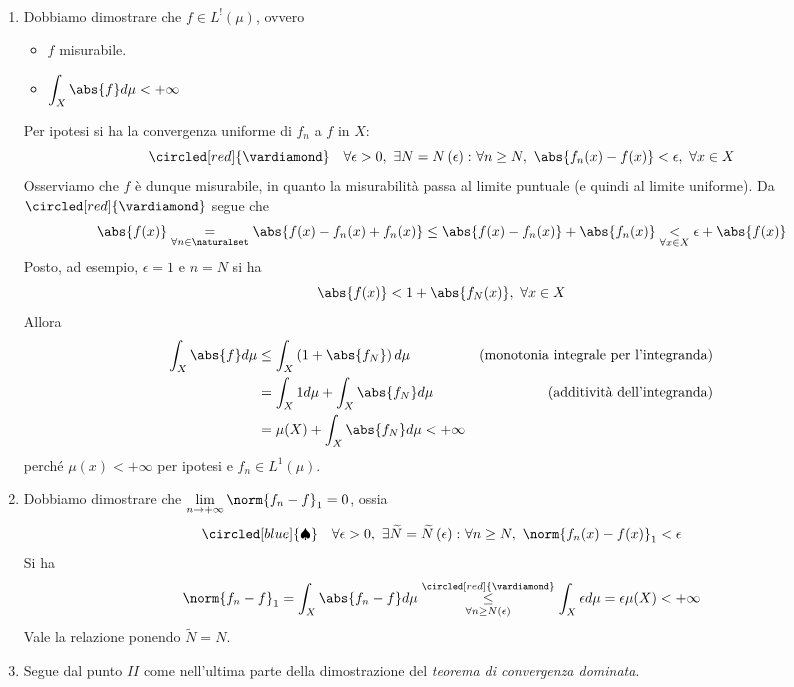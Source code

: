 \begin{demonstration}~{}
	\begin{enumerate}[label=(\Roman*)]
		\item Dobbiamo dimostrare che $f\in L^!\left(\mu\right)$, ovvero
		\begin{itemize}
			\item $f$ misurabile.
			\item $\displaystyle\int_X\abs{f}d\mu<+\infty$
		\end{itemize}
		Per ipotesi si ha la convergenza uniforme di $f_n$ a $f$ in $X$:
		\begin{equation*}
			\circled[red]{\vardiamond}\quad \forall \epsilon > 0,\ \exists N=N\left(\epsilon\right)\colon \forall n\geq N,\ \abs{f_n(x)-f(x)}<\epsilon,\ \forall x\in X
		\end{equation*}
		Osserviamo che $f$ è dunque misurabile, in quanto la misurabilità passa al limite puntuale (e quindi al limite uniforme). Da $\circled[red]{\vardiamond}$ segue che
		\begin{equation*}
			\abs{f(x)}\underset{\forall n\in\naturalset}{=}\abs{f(x)-f_n(x)+f_n(x)}\leq\abs{f(x)-f_n(x)}+\abs{f_n(x)}\underset{\forall x\in X}{<}\epsilon +\abs{f(x)}
		\end{equation*}
		Posto, ad esempio, $\epsilon = 1$ e $n=N$ si ha
		\begin{equation*}
			\abs{f(x)}<1+\abs{f_N(x)},\ \forall x\in X
		\end{equation*}
		Allora
		\begin{align*}
			\int_X\abs{f}d\mu&\leq \int_X \left(1+\abs{f_N}\right)d\mu&\text{(monotonia integrale per l'integranda)}\\
			&=\int_{X}1d\mu+\int_X\abs{f_N}d\mu&\text{(additività dell'integranda)}\\
			&=\mu(X)+\int_X\abs{f_N}d\mu <+\infty&
		\end{align*}
		perché $\mu(x)<+\infty$ per ipotesi e $f_n\in L^1\left(\mu\right)$.
		\item Dobbiamo dimostrare che $\displaystyle\lim_{n\to+\infty}\norm{f_n-f}_1=0$, ossia
		\begin{equation*}
			\circled[blue]{\spadesuit}\quad \forall \epsilon > 0,\ \exists \widetilde{N}=\widetilde{N}\left(\epsilon\right)\colon \forall n\geq N,\ \norm{f_n(x)-f(x)}_1<\epsilon
		\end{equation*}
		Si ha
		\begin{equation*}
			\norm{f_n-f}_1=\int_X\abs{f_n-f}d\mu\underset{\forall n\geq N\left(\epsilon\right)}{\overset{\circled[red]{\vardiamond}}{\leq}}\int_X\epsilon d\mu=\epsilon \mu(X)<+\infty
		\end{equation*}
		Vale la relazione \circled[blue]{\spadesuit} ponendo $\widetilde{N}=N$.
		\item Segue dal punto $II$ come nell'ultima parte della dimostrazione del \textit{teorema di convergenza dominata}.
	\end{enumerate}
\end{demonstration}
